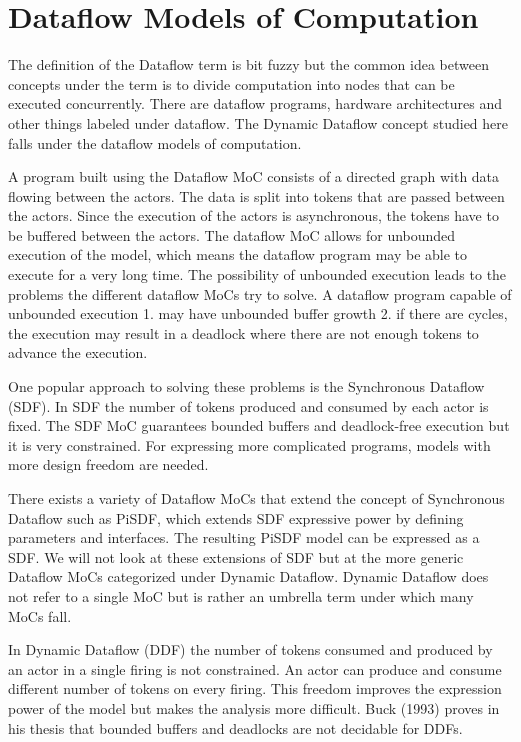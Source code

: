 \chapter{Dataflow Models of Computation}
\label{chapter:dataflow}
The definition of the Dataflow term is bit fuzzy but the common idea between
concepts under the term is to divide computation into nodes that can be executed
concurrently. There are dataflow programs, hardware architectures and other
things labeled under dataflow. The Dynamic Dataflow concept studied here falls
under the dataflow models of computation.

A program built using the Dataflow MoC consists of a directed graph with data
flowing between the actors. The data is split into tokens that are passed
between the actors. Since the execution of the actors is asynchronous, the
tokens have to be buffered between the actors. The dataflow MoC allows for
unbounded execution of the model, which means the dataflow program may be able
to execute for a very long time. The possibility of unbounded execution leads to
the problems the different dataflow MoCs try to solve. A dataflow program
capable of unbounded execution 1. may have unbounded buffer growth 2. if there
are cycles, the execution may result in a deadlock where there are not enough
tokens to advance the execution.

One popular approach to solving these problems is the Synchronous Dataflow
(SDF). In SDF the number of tokens produced and consumed by each actor is fixed.
The SDF MoC guarantees bounded buffers and deadlock-free execution but it is
very constrained. For expressing more complicated programs, models with more
design freedom are needed.

There exists a variety of Dataflow MoCs that extend the concept of Synchronous
Dataflow such as PiSDF, which extends SDF expressive power by defining
parameters and interfaces. The resulting PiSDF model can be expressed as a SDF.
We will not look at these extensions of SDF but at the more generic Dataflow
MoCs categorized under Dynamic Dataflow. Dynamic Dataflow does not refer to a
single MoC but is rather an umbrella term under which many MoCs fall.

In Dynamic Dataflow (DDF) the number of tokens consumed and produced by an actor
in a single firing is not constrained. An actor can produce and consume
different number of tokens on every firing. This freedom improves the expression
power of the model but makes the analysis more difficult. Buck (1993) proves in
his thesis that bounded buffers and deadlocks are not decidable for DDFs.

